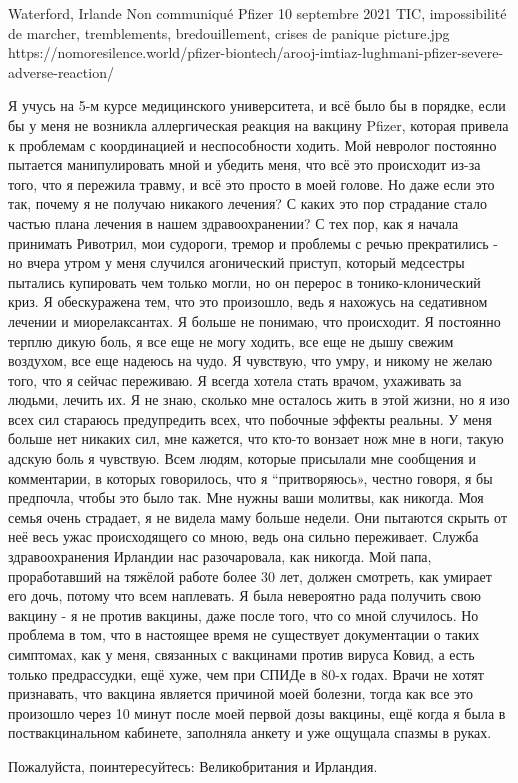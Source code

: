           {Waterford, Irlande}
          {Non communiqué}
          {Pfizer}
          {10 septembre 2021}
          {TIC, impossibilité de marcher, tremblements, bredouillement, crises de panique}
          {picture.jpg}
          {https://nomoresilence.world/pfizer-biontech/arooj-imtiaz-lughmani-pfizer-severe-adverse-reaction/}
          {

Я учусь на 5-м курсе медицинского университета, и всё было бы в порядке, если бы
у меня не возникла аллергическая реакция на вакцину Pfizer, которая привела к
проблемам с координацией и неспособности ходить. Мой невролог постоянно пытается
манипулировать мной и убедить меня, что всё это происходит из-за того, что я
пережила травму, и всё это просто в моей голове. Но даже если это так, почему я
не получаю никакого лечения? С каких это пор страдание стало частью плана
лечения в нашем здравоохранении? С тех пор, как я начала принимать Ривотрил, мои
судороги, тремор и проблемы с речью прекратились - но вчера утром у меня
случился агонический приступ, который медсестры пытались купировать чем только
могли, но он перерос в тонико-клонический криз. Я обескуражена тем, что это
произошло, ведь я нахожусь на седативном лечении и миорелаксантах. Я больше не
понимаю, что происходит. Я постоянно терплю дикую боль, я все еще не могу
ходить, все еще не дышу свежим воздухом, все еще надеюсь на чудо. Я чувствую,
что умру, и никому не желаю того, что я сейчас переживаю. Я всегда хотела стать
врачом, ухаживать за людьми, лечить их. Я не знаю, сколько мне осталось жить в
этой жизни, но я изо всех сил стараюсь предупредить всех, что побочные эффекты
реальны. У меня больше нет никаких сил, мне кажется, что кто-то вонзает нож мне
в ноги, такую адскую боль я чувствую. Всем людям, которые присылали мне
сообщения и комментарии, в которых говорилось, что я “притворяюсь», честно
говоря, я бы предпочла, чтобы это было так. Мне нужны ваши молитвы, как
никогда. Моя семья очень страдает, я не видела маму больше недели. Они пытаются
скрыть от неё весь ужас происходящего со мною, ведь она сильно
переживает. Служба здравоохранения Ирландии нас разочаровала, как никогда. Мой
папа, проработавший на тяжёлой работе более 30 лет, должен смотреть, как умирает
его дочь, потому что всем наплевать. Я была невероятно рада получить свою
вакцину - я не против вакцины, даже после того, что со мной случилось. Но
проблема в том, что в настоящее время не существует документации о таких
симптомах, как у меня, связанных с вакцинами против вируса Ковид, а есть только
предрассудки, ещё хуже, чем при СПИДе в 80-х годах. Врачи не хотят признавать,
что вакцина является причиной моей болезни, тогда как все это произошло через 10
минут после моей первой дозы вакцины, ещё когда я была в поствакцинальном
кабинете, заполняла анкету и уже ощущала спазмы в руках.

Пожалуйста, поинтересуйтесь: Великобритания и Ирландия.

}

